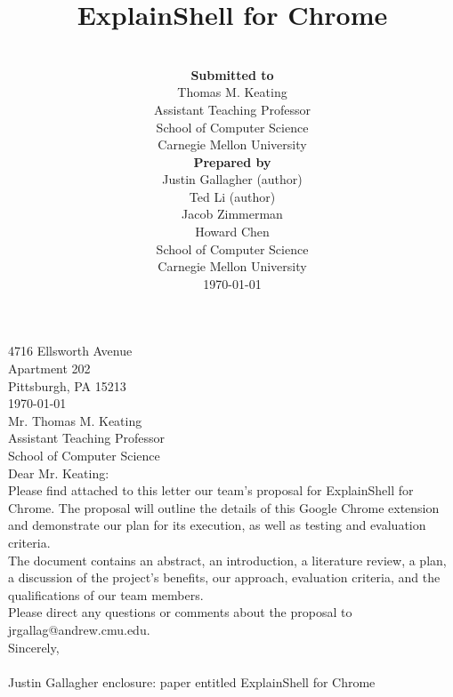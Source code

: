 \documentclass[11pt]{article}
\title{ExplainShell for Chrome \\ \vspace*{.5em} \Large\mytitle}
\date{}
\begin{document}
\clearpage
{}
\thispagestyle{zerostyle}
4716 Ellsworth Avenue\\
Apartment 202\\
Pittsburgh, PA 15213\\

\today\\

Mr. Thomas M. Keating\\
Assistant Teaching Professor\\
School of Computer Science\\

Dear Mr. Keating:\\

Please find attached to this letter our team's proposal for ExplainShell for Chrome. The proposal will outline the details of this Google Chrome extension and demonstrate our plan for its execution, as well as testing and evaluation criteria.\\

The document contains an abstract, an introduction, a literature review, a plan, a discussion of the project's benefits, our approach, evaluation criteria, and the qualifications of our team members.\\

Please direct any questions or comments about the proposal to jrgallag@andrew.cmu.edu.\\

Sincerely,\\

~\\

Justin Gallagher
\vfill
enclosure: paper entitled ExplainShell for Chrome
\newpage

\author{~\\
\normalsize {\bf Submitted to}\\
\normalsize Thomas M. Keating\\
\normalsize Assistant Teaching Professor\\
\normalsize School of Computer Science\\
\normalsize Carnegie Mellon University\vspace*{2em}\\
\normalsize {\bf Prepared by}\\
\normalsize Justin Gallagher (author)\\
\normalsize Ted Li (author)\\
\normalsize Jacob Zimmerman\\
\normalsize Howard Chen\vspace*{2em}\\
\normalsize School of Computer Science\\
\normalsize Carnegie Mellon University\\
\normalsize \today}
\end{document}
